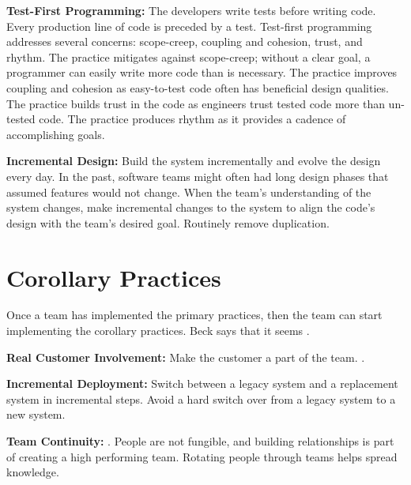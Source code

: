 \textbf{Test-First Programming:} The developers write tests before writing code. Every production line of code is preceded by a test.  Test-first programming addresses several concerns: scope-creep,  coupling and cohesion, trust, and rhythm. The practice mitigates against scope-creep; without a clear goal, a programmer can easily write more code than is necessary. The practice improves coupling and cohesion as easy-to-test code often has beneficial design qualities. The practice builds trust in the code as engineers trust tested code more than un-tested code. The practice produces rhythm as it provides a cadence of accomplishing goals.


\textbf{Incremental Design:} Build the system incrementally and evolve the design every day. In the past, software teams might often had long design phases that assumed features would not change. When the team's understanding of the system changes, make incremental changes to the system to align the code's design with the team's desired goal. Routinely remove duplication.


\section{Corollary Practices}
Once a team has implemented the primary practices, then the team can start implementing the corollary practices. Beck says that it seems  \cite{BeckExtremeProgramming2004}.


\textbf{Real Customer Involvement:} Make the customer a part of the team.   \cite{BeckExtremeProgramming2004}.




\textbf{Incremental Deployment:} Switch between a legacy system and a replacement system in incremental steps. Avoid a hard switch over from a legacy system to a new system.




\textbf{Team Continuity:}   \cite{BeckExtremeProgramming2004}. People are not fungible, and building relationships is part of creating a high performing team. Rotating people through teams helps spread knowledge.


